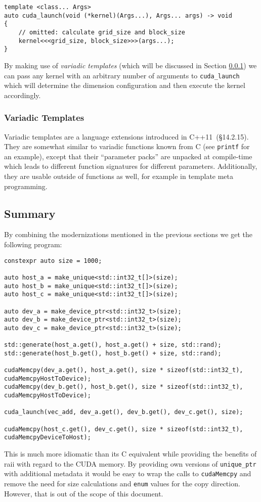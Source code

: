 \begin{lstlisting}
template <class... Args>
auto cuda_launch(void (*kernel)(Args...), Args... args) -> void
{
    // omitted: calculate grid_size and block_size
    kernel<<<grid_size, block_size>>>(args...);
}
\end{lstlisting}

By making use of \textit{variadic templates} (which will be discussed in Section \ref{vec_add:variadic_templates}) we can pass any kernel with an arbitrary number of arguments to \texttt{cuda\_launch} which will determine the dimension configuration and then execute the kernel accordingly.

\subsubsection{Variadic Templates}\label{vec_add:variadic_templates}

Variadic templates are a language extensions introduced in C++11~\cite{cpp11std}(§14.2.15). They are somewhat similar to variadic functions known from C (see \texttt{printf} for an example), except that their ``parameter packs'' are unpacked at compile-time which leads to different function signatures for different parameters. Additionally, they are usable outside of functions as well, for example in template meta programming.

\subsection{Summary}

By combining the modernizations mentioned in the previous sections we get the following program:

\begin{lstlisting}
constexpr auto size = 1000;

auto host_a = make_unique<std::int32_t[]>(size);
auto host_b = make_unique<std::int32_t[]>(size);
auto host_c = make_unique<std::int32_t[]>(size);

auto dev_a = make_device_ptr<std::int32_t>(size);
auto dev_b = make_device_ptr<std::int32_t>(size);
auto dev_c = make_device_ptr<std::int32_t>(size);

std::generate(host_a.get(), host_a.get() + size, std::rand);
std::generate(host_b.get(), host_b.get() + size, std::rand);

cudaMemcpy(dev_a.get(), host_a.get(), size * sizeof(std::int32_t), cudaMemcpyHostToDevice);
cudaMemcpy(dev_b.get(), host_b.get(), size * sizeof(std::int32_t), cudaMemcpyHostToDevice);

cuda_launch(vec_add, dev_a.get(), dev_b.get(), dev_c.get(), size);

cudaMemcpy(host_c.get(), dev_c.get(), size * sizeof(std::int32_t), cudaMemcpyDeviceToHost);
\end{lstlisting}

This is much more idiomatic than its C equivalent while providing the benefits of \gls{raii} with regard to the CUDA memory. By providing own versions of \texttt{unique\_ptr} with additional metadata it would be easy to wrap the calls to \texttt{cudaMemcpy} and remove the need for size calculations and \texttt{enum} values for the copy direction. However, that is out of the scope of this document.